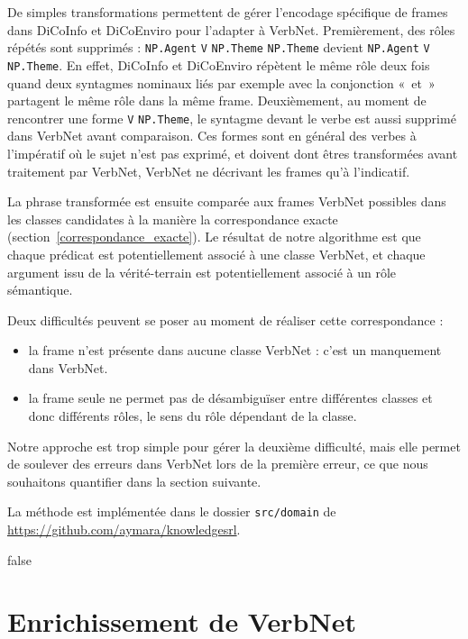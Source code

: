 De simples transformations permettent de gérer l'encodage spécifique de frames
dans DiCoInfo et DiCoEnviro pour l'adapter à VerbNet. Premièrement, des rôles
répétés sont supprimés : \texttt{NP.Agent} \texttt{V} \texttt{NP.Theme}
\texttt{NP.Theme} devient \texttt{NP.Agent} \texttt{V} \texttt{NP.Theme}. En
effet, DiCoInfo et DiCoEnviro répètent le même rôle deux fois quand deux
syntagmes nominaux liés par exemple avec la conjonction «~et~» partagent le
même rôle dans la même frame. Deuxièmement, au moment de rencontrer une forme
\texttt{V} \texttt{NP.Theme}, le syntagme devant le verbe est aussi supprimé
dans VerbNet avant comparaison. Ces formes sont en général des verbes à
l'impératif où le sujet n'est pas exprimé, et doivent dont êtres transformées
avant traitement par VerbNet, VerbNet ne décrivant les frames qu'à l'indicatif.

La phrase transformée est ensuite comparée aux frames VerbNet possibles dans
les classes candidates à la manière la correspondance exacte
(section~\ref{correspondance_exacte}). Le résultat de notre algorithme est que
chaque prédicat est potentiellement associé à une classe VerbNet, et chaque
argument issu de la vérité-terrain est potentiellement associé à un rôle
sémantique.

Deux difficultés peuvent se poser au moment de réaliser cette correspondance :
\begin{itemize}
    \item la frame n'est présente dans aucune classe VerbNet : c'est un
        manquement dans VerbNet.
    \item la frame seule ne permet pas de désambiguïser entre différentes
        classes et donc différents rôles, le sens du rôle dépendant de la
        classe.
\end{itemize}

Notre approche est trop simple pour gérer la deuxième difficulté, mais elle
permet de soulever des erreurs dans VerbNet lors de la première erreur, ce que
nous souhaitons quantifier dans la section suivante.

La méthode est implémentée dans le dossier \texttt{src/domain} de
\url{https://github.com/aymara/knowledgesrl}.

\if false

\section{Enrichissement de VerbNet}
\label{sec:enrichissement_verbnet}

